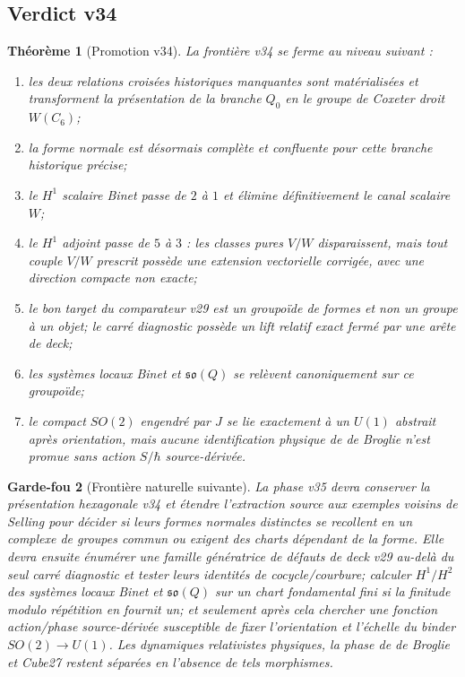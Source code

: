 \documentclass[11pt,a4paper]{article}
\newtheorem{theorem}{Théorème}[section]
\newtheorem{guardrail}[theorem]{Garde-fou}
\begin{document}
\subsection{Verdict v34}

\begin{theorem}[Promotion v34]\label{thm:v34-verdict}
La frontière v34 se ferme au niveau suivant :
\begin{enumerate}[label=\textup{(\roman*)}]
\item les deux relations croisées historiques manquantes sont matérialisées et transforment la
présentation de la branche $Q_0$ en le groupe de Coxeter droit $W(C_6)$;
\item la forme normale est désormais complète et confluente pour cette branche historique précise;
\item le $H^1$ scalaire Binet passe de $2$ à $1$ et élimine définitivement le canal scalaire $W$;
\item le $H^1$ adjoint passe de $5$ à $3$ : les classes pures $V/W$ disparaissent, mais tout couple
$V/W$ prescrit possède une extension vectorielle corrigée, avec une direction compacte non exacte;
\item le bon target du comparateur v29 est un groupoïde de formes et non un groupe à un objet;
le carré diagnostic possède un lift relatif exact fermé par une arête de deck;
\item les systèmes locaux Binet et $\mathfrak{so}(Q)$ se relèvent canoniquement sur ce groupoïde;
\item le compact $SO(2)$ engendré par $J$ se lie exactement à un $U(1)$ abstrait après orientation,
mais aucune identification physique de de Broglie n'est promue sans action $S/\hbar$ source-dérivée.
\end{enumerate}
\end{theorem}

\begin{guardrail}[Frontière naturelle suivante]
La phase v35 devra conserver la présentation hexagonale v34 et étendre l'extraction source aux
exemples voisins de Selling pour décider si leurs formes normales distinctes se recollent en un
complexe de groupes commun ou exigent des charts dépendant de la forme. Elle devra ensuite
énumérer une famille génératrice de défauts de deck v29 au-delà du seul carré diagnostic et tester
leurs identités de cocycle/courbure; calculer $H^1/H^2$ des systèmes locaux Binet et
$\mathfrak{so}(Q)$ sur un chart fondamental fini si la finitude modulo répétition en fournit un;
et seulement après cela chercher une fonction action/phase source-dérivée susceptible de fixer
l'orientation et l'échelle du binder $SO(2)\to U(1)$. Les dynamiques relativistes physiques,
la phase de de Broglie et Cube27 restent séparées en l'absence de tels morphismes.
\end{guardrail}
\end{document}
